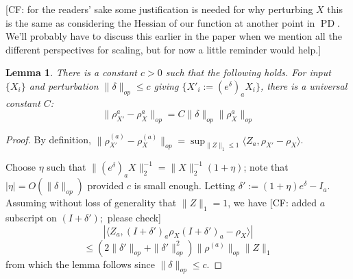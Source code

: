 \documentclass{article}
\newtheorem{lemma}[theorem]{Lemma}
\newcommand\PD{\operatorname{PD}}
\newcommand{\CF}[1]{{\color{purple}[CF: #1]}}
\begin{document}
\CF{for the readers' sake some justification is needed for why perturbing $X$ this is the same as considering the Hessian of our function at another point in $\PD$. We'll probably have to discuss this earlier in the paper when we mention all the different perspectives for scaling, but for now a little reminder would help.}
\begin{lemma} \label{atoaaRobustness}
There is a constant $c>0$ such that the following holds. For input $\{X_{i}\}$ and perturbation $\|\delta\|_{op} \leq c$ giving $\{X'_{i} := (e^{\delta})_{a} X_{i} \}$, there is a universal constant $C$:
\[ \|\rho_{X'}^{a} - \rho_{X}^{a}\|_{op} = C \|\delta\|_{op} \|\rho_{X}^{a}\|_{op}     \]
\end{lemma}
\begin{proof} By definition, $\|\rho_{X'}^{(a)} - \rho_{X}^{(a)}\|_{op} = \sup_{\|Z\|_{1} \leq 1} \langle Z_{a}, \rho_{X'} - \rho_{X} \rangle $. 

Choose $\eta$ such that  $\|(e^{\delta})_{a} X\|_{2}^{-1} = \|X\|_{2}^{-1} (1 + \eta)$; note that $|\eta| = O(\|\delta\|_{op})$ provided $c$ is small enough. Letting $\delta' := (1+\eta)e^{\delta} - I_{a}$. Assuming without loss of generality that $\|Z\|_{1} = 1$, we have \CF{added $a$ subscript on $(I + \delta');$ please check}
\[ | \langle Z_{a}, (I+\delta')_a \rho_{X} (I+\delta')_a - \rho_{X} \rangle | \]
\[ \leq (2\|\delta'\|_{op} + \|\delta'\|_{op}^{2}) \|\rho^{(a)}\|_{op} \|Z\|_{1}    \]
from which the lemma follows since $\|\delta\|_{op} \leq c$.
\end{proof}
\end{document}
